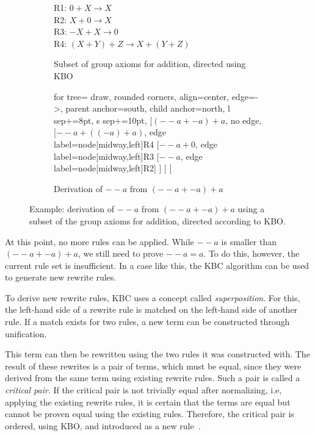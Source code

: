 \begin{figure}[h]
	\centering
	\hfill
	\begin{subfigure}[c]{0.55\textwidth}
		\vspace*{\fill} %
		R1: $0 + X \rightarrow X$\\
		R2: $X + 0 \rightarrow X$\\
		R3: $-X + X \rightarrow 0$\\
		R4: $(X +Y) + Z \rightarrow X + (Y + Z)$
		\vspace*{\fill}
		\caption{\scriptsize Subset of group axioms for addition, directed using KBO}
		\label{fig:kbc-sub1}
	\end{subfigure}
	\hfill
	\begin{subfigure}[c]{0.4\textwidth}
		\centering
		\begin{forest}
			for tree={
				draw,
				rounded corners,
				align=center,
				edge={->},
				parent anchor=south,
				child anchor=north,
				l sep+=8pt,
				s sep+=10pt,
			}
			[$(--a + -a) + a$, no edge,
			[$--a + ((-a) + a)$, edge label={node[midway,left]{R4}}
			[$--a + 0$, edge label={node[midway,left]{R3}}
			[$--a$, edge label={node[midway,left]{R2}}]
			]
			]
			]
		\end{forest}
		\caption{\scriptsize Derivation of $--a$ from $(--a + -a) + a$}
		\label{fig:kbc-sub2}
	\end{subfigure}
	
	\caption{Example: derivation of $--a$ from $(--a + -a) + a$ using a subset of the group axioms for addition, directed according to KBO.}
	\label{fig:kbc-example}
\end{figure}

\FloatBarrier
At this point, no more rules can be applied. While $--a$ is smaller than $(--a + -a) + a$, we still need to prove $--a = a$. To do this, however, the current rule set is insufficient. In a case like this, the KBC algorithm can be used to generate new rewrite rules.

To derive new rewrite rules, KBC uses a concept called \emph{superposition}. For this, the left-hand side of a rewrite rule is matched on the left-hand side of another rule. If a match exists for two rules, a new term can be constructed through unification. 

This term can then be rewritten using the two rules it was constructed with. The result of these rewrites is a pair of terms, which must be equal, since they were derived from the same term using existing rewrite rules. Such a pair is called a \emph{critical pair}. If the critical pair is not trivially equal after normalizing, i.e, applying the existing rewrite rules, it is certain that the terms are equal but cannot be proven equal using the existing rules. Therefore, the critical pair is ordered, using KBO, and introduced as a new rule~\citep{10.1093/comjnl/34.1.2}.

